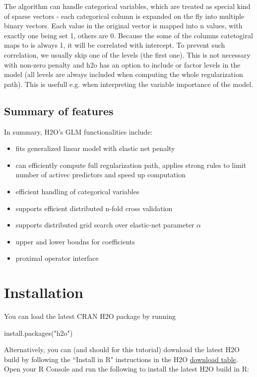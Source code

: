 \documentclass[11pt]{article}
\begin{document}
The algorithm can handle categorical variables, which are treated as special kind of sparse vectors - each categorical column is expanded on the fly into multiple binary vectors. Each value in the original vector is mapped into n values, with exactly one being set 1, others are 0. Because the some of the columns catetogiral maps to is always 1, it will be correlated with intercept. To prevent such correlation, we usually skip one of the levels (the first one). This is not necessary with non-zero penalty and h2o has an option to include or factor levels in the model (all levels are always included when computing the whole regularization path). This is usefull e.g. when interpreting the variable importance of the model. 


\subsection{Summary of features} 
In summary, H2O's GLM functionalities include:

\begin{itemize} %
\item fits generalized linear model with elastic net penalty
\item can efficiently compute full regularization path, applies strong rules to limit number of activec predictors and speed up computation
\item efficient handling of categorical variables
\item supports efficient distributed n-fold cross validation
\item supports distributed grid search over elastic-net parameter $\alpha$
\item upper and lower boudns for coefficients
\item proximal operator interface
\end{itemize}



\section{Installation} 

You can load the latest CRAN H2O package by running

\begin{spverbatim}
install.packages("h2o")
\end{spverbatim}
\bigskip
\noindent
Alternatively, you can (and should for this tutorial) download the latest H2O build by following the ``Install in R" instructions in the H2O \href{http://s3.amazonaws.com/h2o-release/h2o/master/latest.html}{download table}. Open your R Console and run the following to install the latest H2O build in R:
\end{document}
